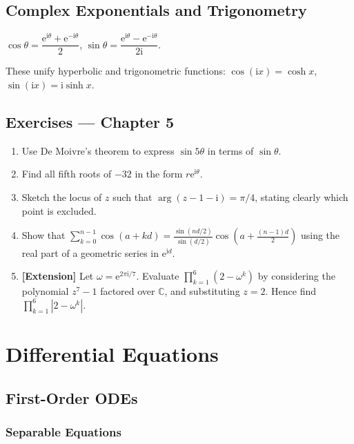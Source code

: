\documentclass[12pt, a4paper]{book}
\newenvironment{keyresult}{%
  \begin{tcolorbox}[keystyle]%
}{%
  \end{tcolorbox}%
}
\newcommand{\C}{\mathbb{C}}
\newcommand{\e}{\mathrm{e}}
\newcommand{\ii}{\mathrm{i}}
\begin{document}
\section{Complex Exponentials and Trigonometry}

\begin{keyresult}
$\cos\theta=\dfrac{\e^{\ii\theta}+\e^{-\ii\theta}}{2}$, \quad
$\sin\theta=\dfrac{\e^{\ii\theta}-\e^{-\ii\theta}}{2\ii}$.

These unify hyperbolic and trigonometric functions: $\cos(\ii x)=\cosh x$, $\sin(\ii x)=\ii\sinh x$.
\end{keyresult}

\section*{Exercises --- Chapter 5}
\begin{enumerate}[label=\textbf{\arabic*.}]
  \item Use De Moivre's theorem to express $\sin 5\theta$ in terms of $\sin\theta$.
  \item Find all fifth roots of $-32$ in the form $r\e^{\ii\theta}$.
  \item Sketch the locus of $z$ such that $\arg(z-1-\ii)=\pi/4$, stating clearly which point is excluded.
  \item Show that $\displaystyle\sum_{k=0}^{n-1}\cos(a+kd)=\frac{\sin(nd/2)}{\sin(d/2)}\cos\!\left(a+\frac{(n-1)d}{2}\right)$ using the real part of a geometric series in $\e^{\ii d}$.
  \item \textbf{[Extension]} Let $\omega=\e^{2\pi\ii/7}$. Evaluate $\displaystyle\prod_{k=1}^{6}(2-\omega^k)$ by considering the polynomial $z^7-1$ factored over $\C$, and substituting $z=2$. Hence find $\displaystyle\prod_{k=1}^{6}|2-\omega^k|$.
\end{enumerate}

\chapter{Differential Equations}

\section{First-Order ODEs}

\subsection{Separable Equations}
\end{document}
